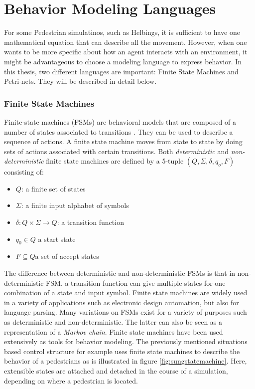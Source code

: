 \documentclass[11pt, a4paper]{book}
\begin{document}
\section{Behavior Modeling Languages}
For some Pedestrian simulatinos, such as Helbings, it is sufficient to have one mathematical equation that can describe all the movement. However, when one wants to be more specific about how an agent interacts with an environment, it might be advantageous to choose a modeling language to express behavior. In this thesis, two different languages are important: Finite State Machines and Petri-nets. They will be described in detail below.

\subsubsection{Finite State Machines}
\label{sec:finitestatemachines}
Finite-state machines (FSMs) are behavioral models that are composed of a number of states associated to transitions \cite{gill1962introduction}. They can be used to describe a sequence of actions. A finite state machine moves from state to state by doing sets of actions associated with certain transitions.
Both \emph{deterministic} and \emph{non-deterministic} finite state machines are defined by a 5-tuple $(Q, \Sigma, \delta, q_o, F)$ consisting of:
\begin{itemize}
\item $Q$: a finite set of states
\item $\Sigma$: a finite input alphabet of symbols
\item $\delta : Q \times \Sigma \rightarrow Q$: a transition function 
\item $q_0 \in Q$ a start state 
\item $F \subseteq Q$a set of accept states 
\end{itemize}
The difference between deterministic and non-deterministic FSMs is that in non-deterministic FSM, a transition function can give multiple states for one combination of a state and input symbol.
Finite state machines are widely used in a variety of applications such as electronic design automation, but also for language parsing. Many variations on FSMs exist for a variety of purposes such as deterministic and non-deterministic. The latter can also be seen as a representation of a \emph{Markov chain}. Finite state machines have been used extensively as tools for behavior modeling. The previously mentioned situations based control structure for example uses finite state machines to describe the behavior of a pedestrians as is illustrated in figure \ref{fig:sungstatemachine}. Here, extensible states are attached and detached in the course of a simulation, depending on where a pedestrian is located.
\end{document}
